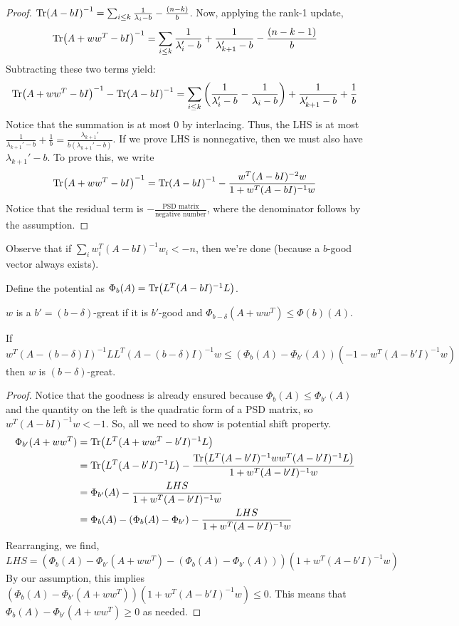 \begin{proof}
    $\Tr(A -bI)^{-1} = \sum_{i \le k} \frac{1}{\lambda_i - b} - \frac{(n - k)}{b}$.
    Now, applying the rank-1 update,
    \[ \Tr(A + ww^T - bI)^{-1} = \sum_{i \le k} \frac{1}{\lambda_i' - b} + \frac{1}{\lambda'_{k + 1} - b} - \frac{(n - k - 1)}{b} \]
    Subtracting these two terms yield:
    \[  \Tr(A + ww^T - bI)^{-1}  - \Tr(A -bI)^{-1} = \sum_{i \le k} \qty(\frac{1}{\lambda_i' - b} - \frac{1}{\lambda_i - b}) + \frac{1}{\lambda_{k + 1}' - b} + \frac{1}{b} \]
    Notice that the summation is at most $0$ by interlacing. Thus, the LHS is at most $\frac{1}{\lambda_{k+ 1}' - b} + \frac{1}{b} = \frac{\lambda_{k+1}'}{b(\lambda_{k+1}' - b)}$.
    If we prove LHS is nonnegative, then we must also have $\lambda_{k+1}' - b$.
    To prove this, we write
    \[ \Tr(A + ww^T - bI)^{-1} = \Tr(A -bI)^{-1} - \frac{w^T (A - bI)^{-2} w}{1 + w^T(A - bI)^{-1}w}  \]
    Notice that the residual term is $- \frac{\text{PSD matrix}}{\text{negative number}}$,
    where the denominator follows by the assumption.
\end{proof}

Observe that if $\sum_i w_i^T (A - bI)^{-1} w_i < -n$,
then we're done (because a $b$-good vector always exists).

\begin{definition}
    Define the potential as $\Phi_b(A) = \Tr(L^T(A - bI)^{-1} L)$.
\end{definition}

\begin{definition}
    $w$ is a $b' = (b-\delta)$-great if it is $b'$-good
    and $\Phi_{b - \delta}(A + ww^T) \le \Phi(b)(A)$.
\end{definition}

\begin{lemma}
    If 
    \[ w^T (A - (b - \delta)I)^{-1} LL^T (A - (b - \delta)I)^{-1} w \le (\Phi_b(A) -\Phi_{b'}(A))(-1 -w^T (A-b'I)^{-1}w)\]
    then $w$ is $(b-\delta)$-great.
\end{lemma}

\begin{proof}
    Notice that the goodness is already ensured because $\Phi_b(A) \le \Phi_{b'}(A)$ and the quantity
    on the left is the quadratic form of a PSD matrix, so $w^T (A - bI)^{-1} w < - 1$.
    So, all we need to show is potential shift property.
    \begin{align*}
        \Phi_{b'}(A + ww^T) &= \Tr(L^T (A + ww^T - b'I)^{-1}L) \\
        &= \Tr(L^T(A - b'I)^{-1} L) - \frac{\Tr(L^T(A - b'I)^{-1} ww^T (A - b'I)^{-1} L)}{1 + w^T(A - b'I)^{-1}w} \\
        &= \Phi_{b'}(A) - \frac{LHS}{1 + w^T(A - b'I)^{-1}w} \\
        &= \Phi_{b}(A) - (\Phi_b(A) - \Phi_{b'}) - \frac{LHS}{1 + w^T(A - b'I)^{-1}w}
    \end{align*}
    Rearranging, we find,
    \[ LHS= (\Phi_b(A) - \Phi_{b'}(A + ww^T) - (\Phi_b(A) - \Phi_{b'}(A)))(1 + w^T (A - b'I)^{-1}w) \]
    By our assumption, this implies $(\Phi_b(A) - \Phi_{b'}(A + ww^T))(1 + w^T (A - b'I)^{-1} w) \le 0$.
    This means that $\Phi_b(A) - \Phi_{b'}(A + ww^T) \ge 0$ as needed.
\end{proof}


